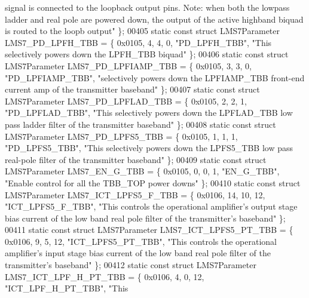 \begin{DoxyCode}
{       signal is connected to the loopback output pins. Note: when both the lowpass ladder and real pole are powered
       down, the output of the active highband biquad is routed to the loopb output"} \};
00405 \textcolor{keyword}{static} \textcolor{keyword}{const} \textcolor{keyword}{struct }LMS7Parameter LMS7_PD_LPFH_TBB = \{ 0x0105, 4, 4, 0, \textcolor{stringliteral}{"PD\_LPFH\_TBB"}, \textcolor{stringliteral}{"This selectively
       powers down the LPFH\_TBB biquad"} \};
00406 \textcolor{keyword}{static} \textcolor{keyword}{const} \textcolor{keyword}{struct }LMS7Parameter LMS7_PD_LPFIAMP_TBB = \{ 0x0105, 3, 3, 0, \textcolor{stringliteral}{"PD\_LPFIAMP\_TBB"}, \textcolor{stringliteral}{"selectively
       powers down the LPFIAMP\_TBB front-end current amp of the transmitter baseband"} \};
00407 \textcolor{keyword}{static} \textcolor{keyword}{const} \textcolor{keyword}{struct }LMS7Parameter LMS7_PD_LPFLAD_TBB = \{ 0x0105, 2, 2, 1, \textcolor{stringliteral}{"PD\_LPFLAD\_TBB"}, \textcolor{stringliteral}{"This
       selectively powers down the LPFLAD\_TBB low pass ladder filter of the transmitter baseband"} \};
00408 \textcolor{keyword}{static} \textcolor{keyword}{const} \textcolor{keyword}{struct }LMS7Parameter LMS7_PD_LPFS5_TBB = \{ 0x0105, 1, 1, 1, \textcolor{stringliteral}{"PD\_LPFS5\_TBB"}, \textcolor{stringliteral}{"This selectively
       powers down the LPFS5\_TBB low pass real-pole filter of the transmitter baseband"} \};
00409 \textcolor{keyword}{static} \textcolor{keyword}{const} \textcolor{keyword}{struct }LMS7Parameter LMS7_EN_G_TBB = \{ 0x0105, 0, 0, 1, \textcolor{stringliteral}{"EN\_G\_TBB"}, \textcolor{stringliteral}{"Enable control for all
       the TBB\_TOP power downs"} \};
00410 \textcolor{keyword}{static} \textcolor{keyword}{const} \textcolor{keyword}{struct }LMS7Parameter LMS7_ICT_LPFS5_F_TBB = \{ 0x0106, 14, 10, 12, \textcolor{stringliteral}{"ICT\_LPFS5\_F\_TBB"}, \textcolor{stringliteral}{"This
       controls the operational amplifier's output stage bias current of the low band real pole filter of the
       transmitter's baseband"} \};
00411 \textcolor{keyword}{static} \textcolor{keyword}{const} \textcolor{keyword}{struct }LMS7Parameter LMS7_ICT_LPFS5_PT_TBB = \{ 0x0106, 9, 5, 12, \textcolor{stringliteral}{"ICT\_LPFS5\_PT\_TBB"}, \textcolor{stringliteral}{"This
       controls the operational amplifier's input stage bias current of the low band real pole filter of the
       transmitter's baseband"} \};
00412 \textcolor{keyword}{static} \textcolor{keyword}{const} \textcolor{keyword}{struct }LMS7Parameter LMS7_ICT_LPF_H_PT_TBB = \{ 0x0106, 4, 0, 12, \textcolor{stringliteral}{"ICT\_LPF\_H\_PT\_TBB"}, \textcolor{stringliteral}{"This
}
\end{DoxyCode}
